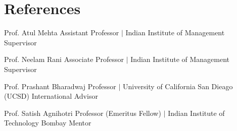 \section{References}
  \CVSubHeadingListStart
    
    \CVSubheading
      {Prof. Atul Mehta}
      {}
      {Assistant Professor $|$ Indian Institute of Management}
      {Supervisor}
      \CVItemListStart
      \CVItemListEnd

    \CVSubheading
      {Prof. Neelam Rani}
      {}
      {Associate Professor $|$ Indian Institute of Management}
      {Supervisor}
      \CVItemListStart
      \CVItemListEnd

    \CVSubheading
      {Prof. Prashant Bharadwaj}
      {}
      {Professor $|$ University of California San Dieago (UCSD)}
      {International Advisor}
      \CVItemListStart
      \CVItemListEnd

    \CVSubheading
      {Prof. Satish Agnihotri}
      {}
      {Professor (Emeritus Fellow) $|$ Indian Institute of Technology Bombay}
      {Mentor}
      \CVItemListStart
      \CVItemListEnd

      
  
    \CVSubHeadingListEnd